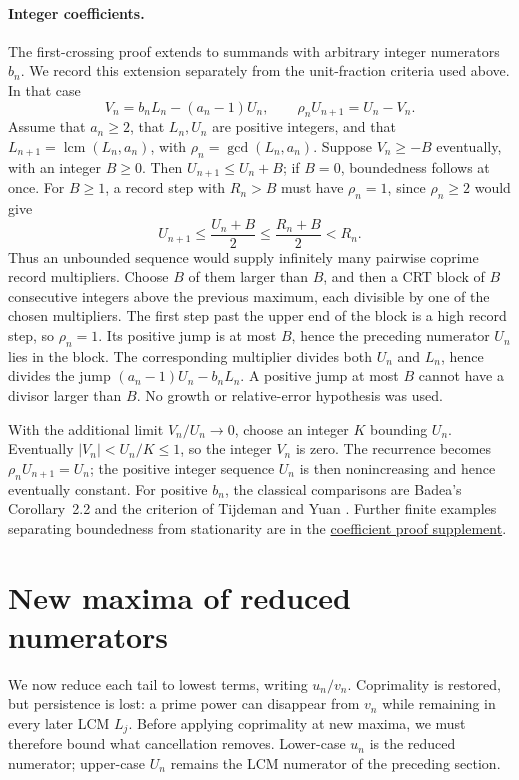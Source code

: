 \documentclass[11pt]{article}
\begin{document}
\paragraph{Integer coefficients.}
The first-crossing proof extends to summands with arbitrary integer
numerators $b_n$. We record this extension separately from the
unit-fraction criteria used above. In that case
\[
 V_n=b_nL_n-(a_n-1)U_n,\qquad
 \rho_nU_{n+1}=U_n-V_n.
\]
Assume that $a_n\ge2$, that $L_n,U_n$ are positive integers, and that
$L_{n+1}=\operatorname{lcm}(L_n,a_n)$, with
$\rho_n=\gcd(L_n,a_n)$. Suppose $V_n\ge-B$ eventually, with an integer
$B\ge0$. Then $U_{n+1}\le U_n+B$; if $B=0$, boundedness follows at once.
For $B\ge1$, a record step with $R_n>B$ must have $\rho_n=1$, since
$\rho_n\ge2$ would give
\[
 U_{n+1}\le\frac{U_n+B}{2}\le\frac{R_n+B}{2}<R_n.
\]
Thus an unbounded sequence would supply infinitely many pairwise coprime
record multipliers. Choose $B$ of them larger than $B$, and then a CRT
block of $B$ consecutive integers above the previous maximum, each
divisible by one of the chosen multipliers. The first step past the upper
end of the block is a high record step, so $\rho_n=1$.
Its positive jump is at most $B$, hence the preceding numerator $U_n$
lies in the block. The corresponding multiplier divides both $U_n$ and
$L_n$, hence divides the jump $(a_n-1)U_n-b_nL_n$. A positive jump at most $B$ cannot have a divisor
larger than $B$. No growth or relative-error hypothesis was used.

With the additional limit $V_n/U_n\to0$, choose an integer $K$ bounding
$U_n$. Eventually $|V_n|<U_n/K\le1$, so the integer $V_n$ is zero.
The recurrence becomes $\rho_nU_{n+1}=U_n$; the positive integer
sequence $U_n$ is then nonincreasing and hence eventually constant. For positive $b_n$, the classical comparisons
are Badea's Corollary~2.2 \cite[p.~316]{badea1993} and the criterion of
Tijdeman and Yuan \cite{tijdemanyuan2002}. Further finite examples
separating boundedness from stationarity are in the
\href{https://github.com/wcook04/plectis-erdos/blob/eccd8afc6db3c02a2265d0601b727d6c5e4467d5/lean/ErdosProblems/Erdos243/CoefficientUniformBoundedHeight.md}
{coefficient proof supplement}.

\section{New maxima of reduced numerators}\label{long243:sec:records}

We now reduce each tail to lowest terms, writing $u_n/v_n$.
Coprimality is restored, but persistence is lost: a prime power can
disappear from $v_n$ while remaining in every later LCM $L_j$.
Before applying coprimality at new maxima, we must therefore bound
what cancellation removes. Lower-case $u_n$ is the reduced numerator;
upper-case $U_n$ remains the LCM numerator of the preceding section.
\end{document}

